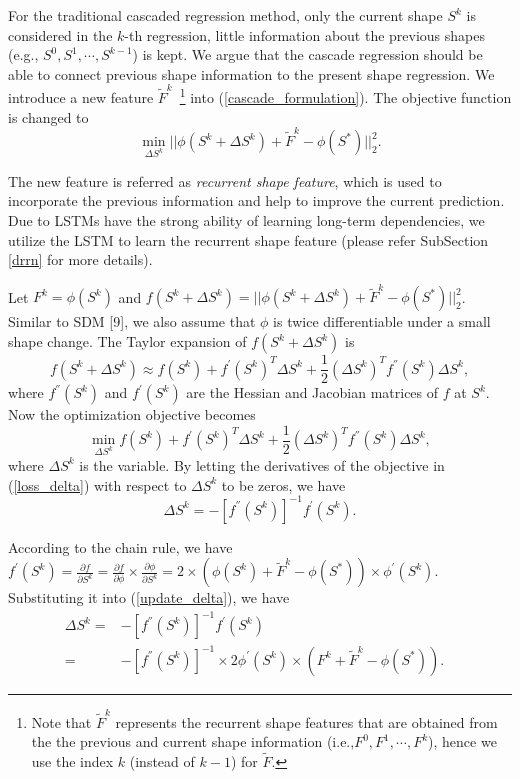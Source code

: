 \documentclass[journal]{IEEEtran}
\begin{document}
For the traditional cascaded regression method, only the current shape $S^k$ is considered in the $k$-th regression, little information about the previous shapes (e.g., $S^0,S^1,\cdots,S^{k-1}$) is kept. We argue that the cascade regression should be able to connect previous shape information to the present shape regression.  We introduce a new feature $\widetilde{F}^{k}$~\footnote{Note that $\widetilde{F}^{k}$ represents the recurrent shape features that are obtained from the the previous and current shape information (i.e.,$F^0,F^1,\cdots,F^k$), hence we use the index $k$ (instead of $k-1$) for $\widetilde{F}$.} into (\ref{cascade_formulation}). The objective function is changed to
\begin{equation}
\min_{\Delta S^k}||\phi(S^k + \Delta S^k) + \widetilde{F}^{k} - \phi(S^*) ||_2^2.
\end{equation}

The new feature is referred as \textit{recurrent shape feature}, which is used to incorporate the previous information and help to improve the current prediction. Due to LSTMs have the strong ability of learning long-term dependencies, we utilize the LSTM to learn the  recurrent shape feature (please refer SubSection \ref{drrn} for more details).

Let $F^k = \phi(S^k)$ and $f(S^k + \Delta S^k) = ||\phi(S^k + \Delta S^k) + \widetilde{F}^{k} - \phi(S^*) ||_2^2$. Similar to SDM [9], we also assume that $\phi$ is twice differentiable under a small shape change. The Taylor expansion of $f(S^k + \Delta S^k)$ is
\begin{equation}
f(S^k + \Delta S^k) \approx f(S^k) +  f^{'}(S^k)^T \Delta S^k + \frac{1}{2} (\Delta S^k)^T  f^{''}(S^k) \Delta S^k,
\end{equation}
where $f^{''}(S^k)$ and $f^{'}(S^k)$ are the Hessian and Jacobian matrices of $f$ at $S^k$. Now the optimization objective becomes
\begin{equation}
\min_{\Delta S^k} f(S^k) +  f^{'}(S^k)^T \Delta S^k + \frac{1}{2} (\Delta S^k)^T  f^{''}(S^k) \Delta S^k,
\label{loss_delta}
\end{equation}
where $\Delta S^k$ is the variable. By letting the derivatives of the objective in (\ref{loss_delta}) with respect to $\Delta S^k$ to be zeros, we have
\begin{equation}
\Delta S^k = - [f^{''}(S^k)]^{-1} f^{'}(S^k).
\label{update_delta}
\end{equation}

According to the chain rule, we have $f^{'}(S^k) = \frac{\partial f}{\partial S^k} = \frac{\partial f}{\partial \phi} \times \frac{\partial \phi}{\partial S^k} = 2 \times (\phi(S^k) + \widetilde{F}^{k} - \phi(S^{*})) \times \phi^{'}(S^k) $. Substituting it into (\ref{update_delta}), we have
\begin{equation}
\begin{aligned}
\Delta S^k = & - [f^{''}(S^k)]^{-1} f^{'}(S^k) & \\
= & - [f^{''}(S^k)]^{-1} \times 2\phi^{'}(S^k)  \times (F^k + \widetilde{F}^{k} - \phi(S^{*})).&
\end{aligned}
\end{equation}
\end{document}
